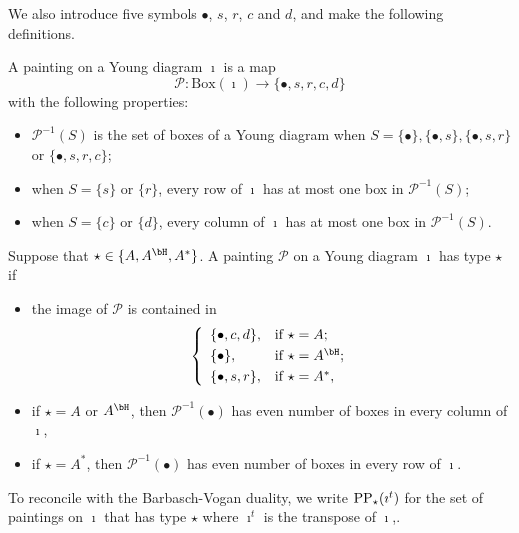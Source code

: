 \documentclass[counting_main.tex]{subfiles}
\begin{document}

\renewcommand{\CP}{\mathcal{P}}
We also introduce five symbols $\bullet$, $s$, $r$, $c$ and $d$, and make the following definitions.
\begin{defn}
A painting on a Young diagram $\imath$ is a map
\[
  \mathcal P: \mathrm{Box}(\imath) \rightarrow \{\bullet, s, r, c, d \}
\]
with the following properties:
\begin{itemize}
\item
 $\mathcal P^{-1}(S)$ is the set of boxes of a Young diagram when $S=\{\bullet\}, \{\bullet, s \}, \{\bullet, s, r\}$ or $\{\bullet, s, r, c \} $;
 \item
 when $S=\{s\}$ or $ \{r\}$, every row of $\imath$ has at most one  box in $\CP^{-1}(S)$;
   \item
 when $S=\{c\}$ or $ \{d \}$, every column of $\imath$ has at most one  box in $\CP^{-1}(S)$.
 \end{itemize}
\end{defn}



\begin{defn}\label{defpbp0}
Suppose that $\star\in \{A, A^\bH, A^*\}$.  A painting $\CP$ on a Young diagram $\imath$ has type $\star$ if
 \begin{itemize}
   \item
 the image of $\CP$ is contained in
 \[
 \left\{
     \begin{array}{ll}
         \{\bullet, c, d\}, &\hbox{if $\star=A$}; \smallskip\\
            \{\bullet\}, &\hbox{if $\star=A^\bH$}; \smallskip\\
          \{\bullet, s, r\}, &\hbox{if $\star=A^*$},            \end{array}
   \right.
 \]
 \item
 if $\star=A$ or $A^\bH$, then $\CP^{-1}(\bullet)$ has even number of boxes in every column of $\imath$,
  \item
 if $\star=A^*$, then $\CP^{-1}(\bullet)$ has even number of boxes in every row of $\imath$.
 \end{itemize}
 To reconcile with the Barbasch-Vogan duality, we write $\mathrm{PP}_\star(\imath^{t})$
 for the set of paintings on $\imath$ that has type $\star$ where $\imath^{t}$
 is the transpose of $\imath$,.

 \end{defn}
\end{document}
